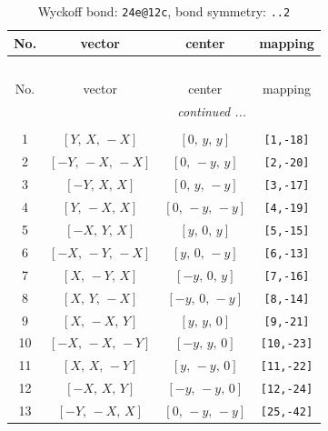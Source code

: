 \documentclass[fleqn,8pt]{jsarticle}
\begin{document}
\begin{longtable}{cccc}
\caption{Wyckoff bond: {\tt 24e@12c}, bond symmetry: {\tt ..2}}
 \\
 \hline \hline
No. & vector & center & mapping \\ \hline \endfirsthead

\multicolumn{3}{l}{\tablename\ \thetable{}} \\
 \hline \hline
No. & vector & center & mapping \\ \hline \endhead

 \hline \hline
\multicolumn{3}{r}{\footnotesize\it continued ...} \\ \endfoot

 \hline \hline
\multicolumn{3}{r}{} \\ \endlastfoot

1 & $\left[ Y,\, X,\, - X \right]$ & $\left[ 0,\, y,\, y \right]$ & {\tt [1,-18]} \\ \hline
2 & $\left[ - Y,\, - X,\, - X \right]$ & $\left[ 0,\, - y,\, y \right]$ & {\tt [2,-20]} \\ \hline
3 & $\left[ - Y,\, X,\, X \right]$ & $\left[ 0,\, y,\, - y \right]$ & {\tt [3,-17]} \\ \hline
4 & $\left[ Y,\, - X,\, X \right]$ & $\left[ 0,\, - y,\, - y \right]$ & {\tt [4,-19]} \\ \hline
5 & $\left[ - X,\, Y,\, X \right]$ & $\left[ y,\, 0,\, y \right]$ & {\tt [5,-15]} \\ \hline
6 & $\left[ - X,\, - Y,\, - X \right]$ & $\left[ y,\, 0,\, - y \right]$ & {\tt [6,-13]} \\ \hline
7 & $\left[ X,\, - Y,\, X \right]$ & $\left[ - y,\, 0,\, y \right]$ & {\tt [7,-16]} \\ \hline
8 & $\left[ X,\, Y,\, - X \right]$ & $\left[ - y,\, 0,\, - y \right]$ & {\tt [8,-14]} \\ \hline
9 & $\left[ X,\, - X,\, Y \right]$ & $\left[ y,\, y,\, 0 \right]$ & {\tt [9,-21]} \\ \hline
10 & $\left[ - X,\, - X,\, - Y \right]$ & $\left[ - y,\, y,\, 0 \right]$ & {\tt [10,-23]} \\ \hline
11 & $\left[ X,\, X,\, - Y \right]$ & $\left[ y,\, - y,\, 0 \right]$ & {\tt [11,-22]} \\ \hline
12 & $\left[ - X,\, X,\, Y \right]$ & $\left[ - y,\, - y,\, 0 \right]$ & {\tt [12,-24]} \\ \hline
13 & $\left[ - Y,\, - X,\, X \right]$ & $\left[ 0,\, - y,\, - y \right]$ & {\tt [25,-42]} \\ \hline

\end{longtable}
\end{document}
